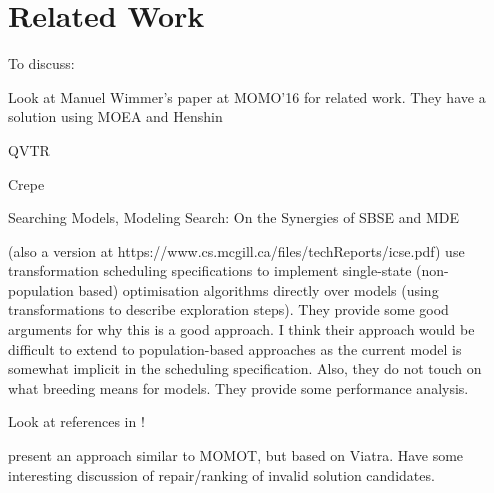 \section{Related Work}
\label{section:related_work}

	\begin{draftlist}
		To discuss:
		\item Look at Manuel Wimmer's paper at MOMO'16 for related work. They have a solution using MOEA and Henshin
		\item QVTR
		\item Crepe
		\item Searching Models, Modeling Search: On the Synergies of SBSE and MDE \cite{Kessentini+13}
		\item \cite{Denil+14} (also a version at https://www.cs.mcgill.ca/files/techReports/icse.pdf) use transformation scheduling specifications to implement 
		      single-state (non-population based) optimisation algorithms directly over models 
		      (using transformations to describe exploration steps). They provide some good arguments for why this is a good approach. I think their approach would be
					difficult to extend to population-based approaches as the current model is somewhat implicit in the scheduling specification. Also, they do not touch on
					what breeding means for models. They provide some performance analysis.
					
					Look at references in \cite{Denil+14}!
					
		\item \cite{Abdeen+14} present an approach similar to MOMOT, but based on Viatra. Have some interesting discussion of repair/ranking of invalid solution
		      candidates.
	\end{draftlist}
